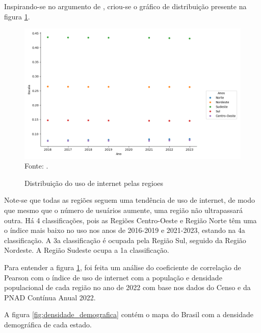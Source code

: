 Inspirando-se no argumento de \cite{HAMAM_2017}, criou-se o gráfico de distribuição presente na figura \ref{fig:distribuicao_uso_internet_regioes}.

\begin{figure}[H]
    \centering
    \caption{Distribuição do uso de internet pelas regioes}
    \includegraphics[width=1\linewidth]{figuras/internet/distribuicao_uso_internet_regioes.png}
    \label{fig:distribuicao_uso_internet_regioes}
    \footnotesize{Fonte: \cite{pnda_continua_anual_2016_2023}.}
\end{figure}

Note-se que todas as regiões seguem uma tendência de uso de internet, de modo que mesmo que o número de usuários aumente, uma região não ultrapassará outra. Há 4 classificações, pois as Regiões Centro-Oeste e Região Norte têm uma o índice mais baixo no uso nos anos de 2016-2019 e 2021-2023, estando na 4a classificação. A 3a classificação é ocupada pela Região Sul, seguido da Região Nordeste. A Região Sudeste ocupa a 1a classificação.

Para entender a figura \ref{fig:distribuicao_uso_internet_regioes}, foi feita um análise do coeficiente de correlação de Pearson com o índice de uso de internet com a população e densidade populacional de cada região no ano de 2022 com base nos dados do Censo e da PNAD Contínua Anual 2022.

A figura \ref{fig:densidade_demografica} contém o mapa do Brasil com a densidade demográfica de cada estado.

